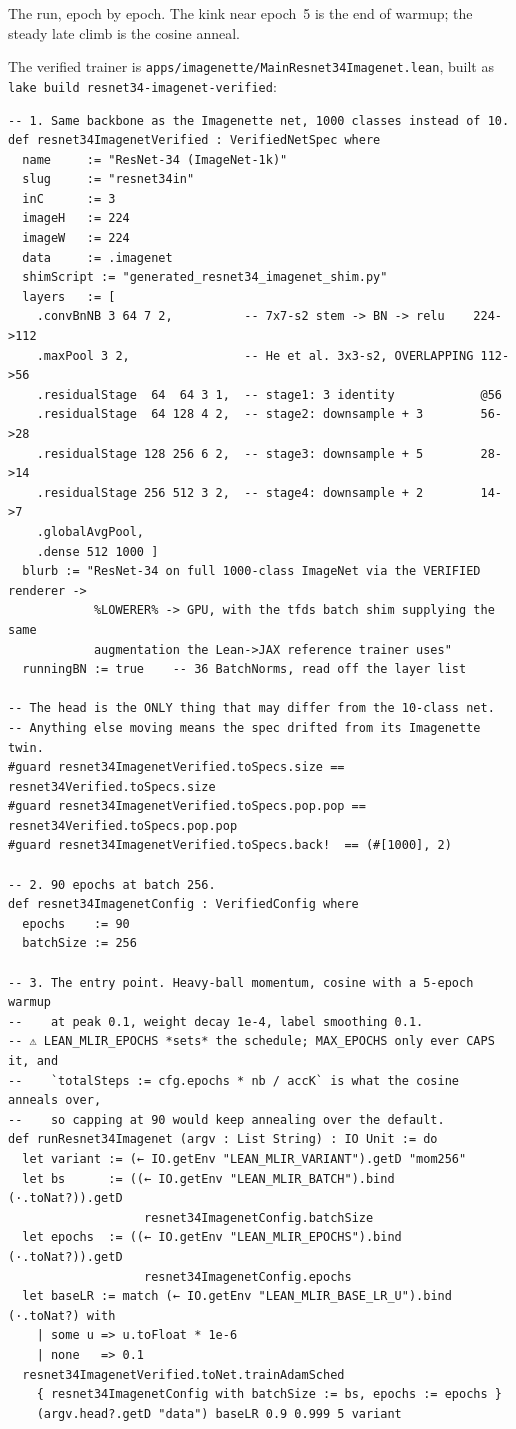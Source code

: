 \noindent The run, epoch by epoch. The kink near epoch~5 is the end of
warmup; the steady late climb is the cosine anneal.

\label{sec:r34_pjrt}

The verified trainer is \texttt{apps/imagenette/MainResnet34Imagenet.lean},
built as \texttt{lake build resnet34-imagenet-verified}:

\begin{verbatim}
-- 1. Same backbone as the Imagenette net, 1000 classes instead of 10.
def resnet34ImagenetVerified : VerifiedNetSpec where
  name     := "ResNet-34 (ImageNet-1k)"
  slug     := "resnet34in"
  inC      := 3
  imageH   := 224
  imageW   := 224
  data     := .imagenet
  shimScript := "generated_resnet34_imagenet_shim.py"
  layers   := [
    .convBnNB 3 64 7 2,          -- 7x7-s2 stem -> BN -> relu    224->112
    .maxPool 3 2,                -- He et al. 3x3-s2, OVERLAPPING 112->56
    .residualStage  64  64 3 1,  -- stage1: 3 identity            @56
    .residualStage  64 128 4 2,  -- stage2: downsample + 3        56->28
    .residualStage 128 256 6 2,  -- stage3: downsample + 5        28->14
    .residualStage 256 512 3 2,  -- stage4: downsample + 2        14->7
    .globalAvgPool,
    .dense 512 1000 ]
  blurb := "ResNet-34 on full 1000-class ImageNet via the VERIFIED renderer ->
            %LOWERER% -> GPU, with the tfds batch shim supplying the same
            augmentation the Lean->JAX reference trainer uses"
  runningBN := true    -- 36 BatchNorms, read off the layer list

-- The head is the ONLY thing that may differ from the 10-class net.
-- Anything else moving means the spec drifted from its Imagenette twin.
#guard resnet34ImagenetVerified.toSpecs.size == resnet34Verified.toSpecs.size
#guard resnet34ImagenetVerified.toSpecs.pop.pop == resnet34Verified.toSpecs.pop.pop
#guard resnet34ImagenetVerified.toSpecs.back!  == (#[1000], 2)

-- 2. 90 epochs at batch 256.
def resnet34ImagenetConfig : VerifiedConfig where
  epochs    := 90
  batchSize := 256

-- 3. The entry point. Heavy-ball momentum, cosine with a 5-epoch warmup
--    at peak 0.1, weight decay 1e-4, label smoothing 0.1.
-- ⚠ LEAN_MLIR_EPOCHS *sets* the schedule; MAX_EPOCHS only ever CAPS it, and
--    `totalSteps := cfg.epochs * nb / accK` is what the cosine anneals over,
--    so capping at 90 would keep annealing over the default.
def runResnet34Imagenet (argv : List String) : IO Unit := do
  let variant := (← IO.getEnv "LEAN_MLIR_VARIANT").getD "mom256"
  let bs      := ((← IO.getEnv "LEAN_MLIR_BATCH").bind (·.toNat?)).getD
                   resnet34ImagenetConfig.batchSize
  let epochs  := ((← IO.getEnv "LEAN_MLIR_EPOCHS").bind (·.toNat?)).getD
                   resnet34ImagenetConfig.epochs
  let baseLR := match (← IO.getEnv "LEAN_MLIR_BASE_LR_U").bind (·.toNat?) with
    | some u => u.toFloat * 1e-6
    | none   => 0.1
  resnet34ImagenetVerified.toNet.trainAdamSched
    { resnet34ImagenetConfig with batchSize := bs, epochs := epochs }
    (argv.head?.getD "data") baseLR 0.9 0.999 5 variant
\end{verbatim}

